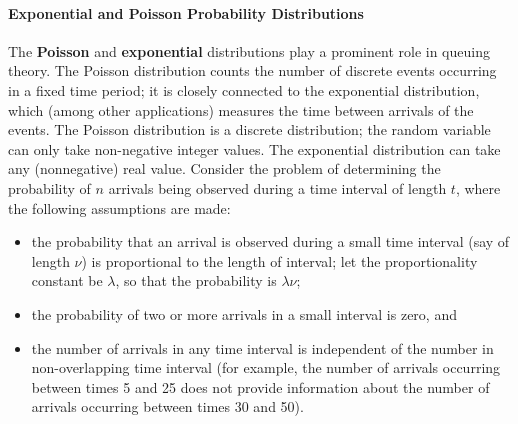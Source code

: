 \paragraph{Exponential and Poisson Probability Distributions}
The \textbf{Poisson} and \textbf{exponential} distributions play a prominent role in queuing theory. The Poisson distribution counts the number of discrete events occurring in a fixed time period; it is closely connected to the exponential distribution, which (among other applications) measures the time between arrivals of the events. The Poisson distribution is a discrete distribution; the random variable can only take non-negative integer values. The exponential distribution can take any (nonnegative) real value.
\newl Consider the problem of determining the probability of $n$ arrivals being observed during a time interval of length $t$, where the following assumptions are made:
\begin{itemize}[noitemsep]
\item the probability that an arrival is observed during a small time interval (say of length $\nu$) is proportional to the length of interval; let the proportionality constant be $\lambda$, so that the probability is $\lambda\nu$;
\item the probability of two or more arrivals in a small interval is zero, and 
\item the number of arrivals in any time interval is independent of the number in non-overlapping time interval (for example, the number of arrivals occurring between times 5 and 25 does not provide information about the number of arrivals occurring between times 30 and 50).
\end{itemize}
